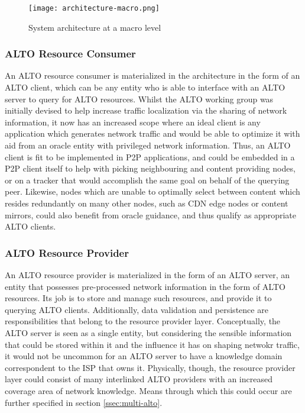 \documentclass[
  oneside,
  11pt, a4paper,
  footinclude=true,
  headinclude=true,
  cleardoublepage=empty
]{scrbook}
\begin{document}
	\begin{figure}[!h]
    \centering
    \texttt{[image: architecture-macro.png]}
    \caption{System architecture at a macro level}
    \label{fig:macro-architecture}
    \end{figure}
	
	\subsubsection{ALTO Resource Consumer}
	
	An ALTO resource consumer is materialized in the architecture in the form of an ALTO client, which can be any entity who is able to interface with an ALTO server to query for ALTO resources. Whilst the ALTO working group was initially devised to help increase traffic localization via the sharing of network information, it now has an increased scope where an ideal client is any application which generates network traffic and would be able to optimize it with aid from an oracle entity with privileged network information. Thus, an ALTO client is fit to be implemented in P2P applications, and could be embedded in a P2P client itself to help with picking neighbouring and content providing nodes, or on a tracker that would accomplish the same goal on behalf of the querying peer. Likewise, nodes which are unable to optimally select between content which resides redundantly on many other nodes, such as CDN edge nodes or content mirrors, could also benefit from oracle guidance, and thus qualify as appropriate ALTO clients.
	
	\subsubsection{ALTO Resource Provider}
	
	An ALTO resource provider is materialized in the form of an ALTO server, an entity that possesses pre-processed network information in the form of ALTO resources. Its job is to store and manage such resources, and provide it to querying ALTO clients. Additionally, data validation and persistence are responsibilities that belong to the resource provider layer. Conceptually, the ALTO server is seen as a single entity, but considering the sensible information that could be stored within it and the influence it has on shaping netwokr traffic, it would not be uncommon for an ALTO server to have a knowledge domain correspondent to the ISP that owns it. Physically, though, the resource provider layer could consist of many interlinked ALTO providers with an increased coverage area of network knowledge. Means through which this could occur are further specified in section \ref{ssec:multi-alto}. 
	
\end{document}
